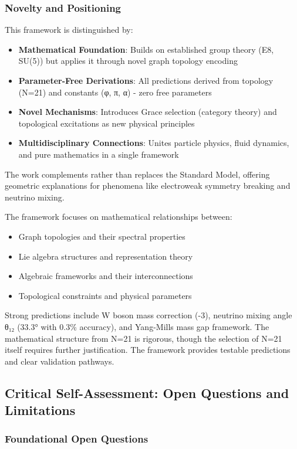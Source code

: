 \documentclass[12pt,a4paper]{article}
\begin{document}
\subsubsection{Novelty and Positioning}
This framework is distinguished by:
\begin{itemize}
\item \textbf{Mathematical Foundation}: Builds on established group theory (E8, SU(5)) but applies it through novel graph topology encoding
\item \textbf{Parameter-Free Derivations}: All predictions derived from topology (N=21) and constants (φ, π, α) - zero free parameters
\item \textbf{Novel Mechanisms}: Introduces Grace selection (category theory) and topological excitations as new physical principles
\item \textbf{Multidisciplinary Connections}: Unites particle physics, fluid dynamics, and pure mathematics in a single framework
\end{itemize}

The work complements rather than replaces the Standard Model, offering geometric explanations for phenomena like electroweak symmetry breaking and neutrino mixing.

The framework focuses on mathematical relationships between:
\begin{itemize}
\item Graph topologies and their spectral properties
\item Lie algebra structures and representation theory
\item Algebraic frameworks and their interconnections
\item Topological constraints and physical parameters
\end{itemize}

Strong predictions include W boson mass correction (-3), neutrino mixing angle θ₁₂ (33.3° with 0.3\% accuracy), and Yang-Mills mass gap framework. The mathematical structure from N=21 is rigorous, though the selection of N=21 itself requires further justification. The framework provides testable predictions and clear validation pathways.

\subsection{Critical Self-Assessment: Open Questions and Limitations}

\subsubsection{Foundational Open Questions}
\end{document}
